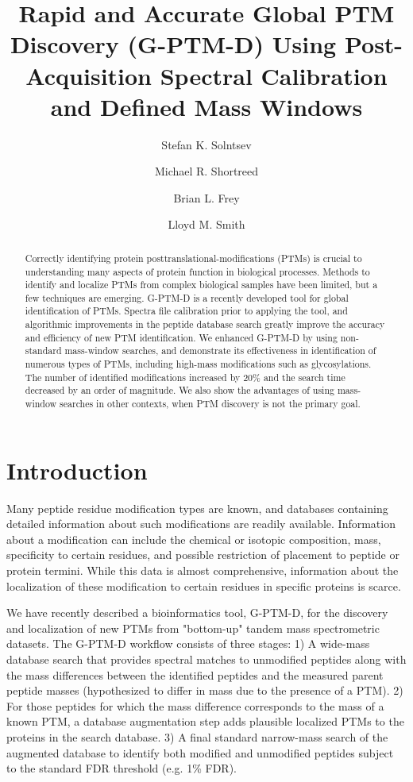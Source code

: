 \documentclass[journal=jprobs,manuscript=article]{achemso}
\author{Stefan K. Solntsev}
\author{Michael R. Shortreed}
\author{Brian L. Frey}
\author{Lloyd M. Smith}
\affiliation[UwMadison]
{University of Wisconsin-Madison}
\title[An \textsf{achemso} demo]
  {Rapid and Accurate Global PTM Discovery (G-PTM-D) Using Post-Acquisition Spectral Calibration and Defined Mass Windows}
\begin{document}
\begin{abstract}

Correctly identifying protein posttranslational-modifications (PTMs) is crucial to understanding many aspects of protein function in biological processes. Methods to identify and localize PTMs from complex biological samples have been limited, but a few techniques are emerging. G-PTM-D\cite{Li_2016} is a recently developed tool for global identification of PTMs. Spectra file calibration prior to applying the tool, and algorithmic improvements in the peptide database search greatly improve the accuracy and efficiency of new PTM identification. We enhanced G-PTM-D by using non-standard mass-window searches, and demonstrate its effectiveness in identification of numerous types of PTMs, including high-mass modifications such as glycosylations. The number of identified modifications increased by 20\% and the search time decreased by an order of magnitude. We also show the advantages of using mass-window searches in other contexts, when PTM discovery is not the primary goal.
\end{abstract}

\section{Introduction}

Many peptide residue modification types are known, and databases containing detailed information about such modifications are readily available. Information about a modification can include the chemical or isotopic composition, mass, specificity to certain residues, and possible restriction of placement to peptide or protein termini. While this data is almost comprehensive, information about the localization of these modification to certain residues in specific proteins is scarce.

We have recently described a bioinformatics tool, G-PTM-D, for the discovery and localization of new PTMs from "bottom-up" tandem mass spectrometric datasets\cite{Li_2016}. The G-PTM-D workflow consists of three stages: 1) A wide-mass database search\cite{Chick_2015,Na_2011} that provides spectral matches to unmodified peptides along with the mass differences between the identified peptides and the measured parent peptide masses (hypothesized to differ in mass due to the presence of a PTM).  2) For those peptides for which the mass difference corresponds to the mass of a known PTM, a database augmentation step adds plausible localized PTMs to the proteins in the search database. 3) A final standard narrow-mass search of the augmented database to identify both modified and unmodified peptides subject to the standard FDR threshold (e.g. 1\% FDR).
\end{document}
